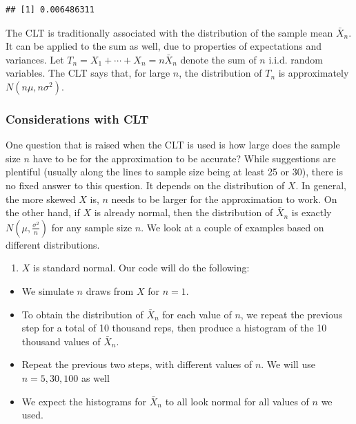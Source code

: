 \documentclass[
]{book}
\providecommand{\tightlist}{%
  \setlength{\itemsep}{0pt}\setlength{\parskip}{0pt}}
\begin{document}
\begin{verbatim}
## [1] 0.006486311
\end{verbatim}

The CLT is traditionally associated with the distribution of the sample mean \(\bar{X}_n\). It can be applied to the sum as well, due to properties of expectations and variances. Let \(T_n = X_1 + \cdots + X_n = n \bar{X}_n\) denote the sum of \(n\) i.i.d. random variables. The CLT says that, for large \(n\), the distribution of \(T_n\) is approximately \(N(n\mu, n\sigma^2)\).

\subsubsection{Considerations with CLT}\label{considerations-with-clt}

One question that is raised when the CLT is used is how large does the sample size \(n\) have to be for the approximation to be accurate? While suggestions are plentiful (usually along the lines to sample size being at least 25 or 30), there is no fixed answer to this question. It depends on the distribution of \(X\). In general, the more skewed \(X\) is, \(n\) needs to be larger for the approximation to work. On the other hand, if \(X\) is already normal, then the distribution of \(\bar{X}_n\) is exactly \(N(\mu, \frac{\sigma^2}{n})\) for any sample size \(n\). We look at a couple of examples based on different distributions.

\begin{enumerate}
\def\labelenumi{\arabic{enumi}.}
\tightlist
\item
  \(X\) is standard normal. Our code will do the following:
\end{enumerate}

\begin{itemize}
\tightlist
\item
  We simulate \(n\) draws from \(X\) for \(n = 1\).
\item
  To obtain the distribution of \(\bar{X}_n\) for each value of \(n\), we repeat the previous step for a total of 10 thousand reps, then produce a histogram of the 10 thousand values of \(\bar{X}_n\).
\item
  Repeat the previous two steps, with different values of \(n\). We will use \(n= 5, 30, 100\) as well
\item
  We expect the histograms for \(\bar{X}_n\) to all look normal for all values of \(n\) we used.
\end{itemize}
\end{document}
